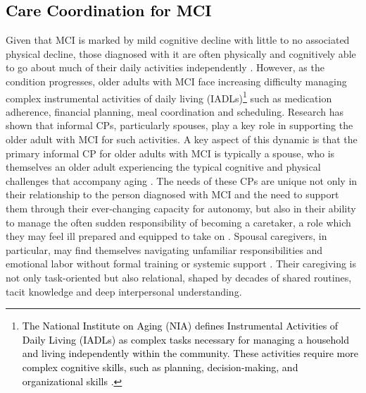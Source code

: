\documentclass[acmsmall]{acmart}
\begin{document}
\subsection{\textcolor{black}{Care Coordination for MCI}}

Given that MCI is marked by mild cognitive decline with little to no associated physical decline, those diagnosed with it are often physically and cognitively able to go about much of their daily activities independently \cite{chandler2019comparative, albert2011diagnosis}. However, as the condition progresses, older adults with MCI face increasing difficulty managing complex instrumental activities of daily living (IADLs)\textcolor{black}{\footnote{\textcolor{black}{The National Institute on Aging (NIA) defines Instrumental Activities of Daily Living (IADLs) as complex tasks necessary for managing a household and living independently within the community. These activities require more complex cognitive skills, such as planning, decision-making, and organizational skills \cite{pashmdarfard2020assessment}.}}} such as medication adherence, financial planning, meal coordination and scheduling. Research has shown that informal CPs, particularly spouses, play a key role in supporting the older adult with MCI for such activities. A key aspect of this dynamic is that the primary informal CP for older adults with MCI is typically a spouse, who is themselves an older adult experiencing the typical cognitive and physical challenges that accompany aging \cite{madjaroff2017narratives, lydon2022integrative}. The needs of these CPs are unique not only in their relationship to the person diagnosed with MCI and the need to support them through their ever-changing capacity for autonomy, but also in their ability to manage the often sudden responsibility of becoming a caretaker, a role which they may feel ill prepared and equipped to take on \cite{adams2006transition, austrom2009long}. Spousal caregivers, in particular, may find themselves navigating unfamiliar responsibilities and emotional labor without formal training or systemic support \cite{dean2012living}. Their caregiving is not only task-oriented but also relational, shaped by decades of shared routines, tacit knowledge and deep interpersonal understanding.
\end{document}
